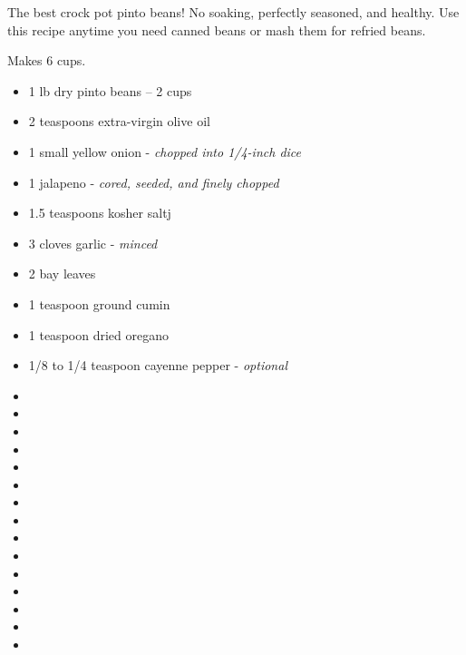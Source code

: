 
The best crock pot pinto beans! No soaking, perfectly seasoned, and healthy.
Use this recipe anytime you need canned beans or mash them for refried beans.

Makes 6 cups.

\begin{itemize}
		\item 1 lb dry pinto beans -- 2 cups
		\item 2 teaspoons extra-virgin olive oil
		\item 1 small yellow onion - \textit{chopped into 1/4-inch dice}
		\item 1 jalapeno - \textit{cored, seeded, and finely chopped}
		\item 1.5 teaspoons kosher saltj
		\item 3 cloves garlic - \textit{minced}
		\item 2 bay leaves
		\item 1 teaspoon ground cumin
		\item 1 teaspoon dried oregano
		\item 1/8 to 1/4 teaspoon cayenne pepper - \textit{optional}
		\item <++>
		\item <++>
		\item <++>
		\item <++>
		\item <++>
		\item <++>
		\item <++>
		\item <++>
		\item <++>
		\item <++>
		\item <++>
		\item <++>
		\item <++>
		\item <++>
		\item <++>
\end{itemize}
